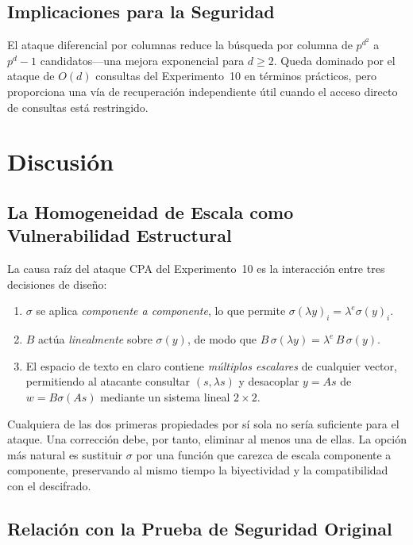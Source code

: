 \documentclass[12pt,a4paper]{article}
\theoremstyle{definition}
\begin{document}
\subsection{Implicaciones para la Seguridad}

El ataque diferencial por columnas reduce la búsqueda por columna de
$p^{d^2}$ a $p^d - 1$ candidatos---una mejora exponencial para
$d \geq 2$. Queda dominado por el ataque de $O(d)$ consultas del
Experimento~10 en términos prácticos, pero proporciona una vía de
recuperación independiente útil cuando el acceso directo de consultas
está restringido.

\section{Discusión}

\subsection{La Homogeneidad de Escala como Vulnerabilidad Estructural}

La causa raíz del ataque CPA del Experimento~10 es la interacción
entre tres decisiones de diseño:
\begin{enumerate}
  \item $\sigma$ se aplica \emph{componente a componente}, lo que
    permite $\sigma(\lambda y)_i = \lambda^e \sigma(y)_i$.
  \item $B$ actúa \emph{linealmente} sobre $\sigma(y)$, de modo que
    $B\,\sigma(\lambda y) = \lambda^e\,B\,\sigma(y)$.
  \item El espacio de texto en claro contiene \emph{múltiplos
    escalares} de cualquier vector, permitiendo al atacante consultar
    $(s, \lambda s)$ y desacoplar $y = As$ de
    $w = B\sigma(As)$ mediante un sistema lineal $2\times 2$.
\end{enumerate}
Cualquiera de las dos primeras propiedades por sí sola no sería
suficiente para el ataque. Una corrección debe, por tanto, eliminar
al menos una de ellas. La opción más natural es sustituir $\sigma$
por una función que carezca de escala componente a componente,
preservando al mismo tiempo la biyectividad y la compatibilidad con
el descifrado.

\subsection{Relación con la Prueba de Seguridad Original}
\end{document}
